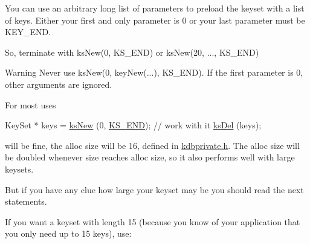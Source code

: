 You can use an arbitrary long list of parameters to preload the keyset with a list of keys. Either your first and only parameter is 0 or your last parameter must be K\+E\+Y\+\_\+\+E\+ND.

So, terminate with ks\+New(0, K\+S\+\_\+\+E\+N\+D) or ks\+New(20, ..., K\+S\+\_\+\+E\+ND)

\begin{DoxyWarning}{Warning}
Never use ks\+New(0, key\+New(...), K\+S\+\_\+\+E\+ND). If the first parameter is 0, other arguments are ignored.
\end{DoxyWarning}
For most uses


\begin{DoxyCodeInclude}
KeySet * keys = \hyperlink{group__keyset_ga671e1aaee3ae9dc13b4834a4ddbd2c3c}{ksNew} (0, \hyperlink{kdbenum_8c_a7a28fce3773b2c873c94ac80b8b4cd54}{KS\_END});
\textcolor{comment}{// work with it}
\hyperlink{group__keyset_ga27e5c16473b02a422238c8d970db7ac8}{ksDel} (keys);
\end{DoxyCodeInclude}
 will be fine, the alloc size will be 16, defined in \hyperlink{kdbprivate_8h}{kdbprivate.\+h}. The alloc size will be doubled whenever size reaches alloc size, so it also performs well with large keysets.

But if you have any clue how large your keyset may be you should read the next statements.

If you want a keyset with length 15 (because you know of your application that you only need up to 15 keys), use\+:


